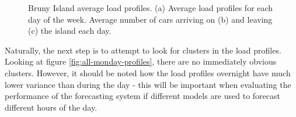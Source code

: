 \begin{figure}[htbp]
	\centering
	\vfil
	\vfil
	\caption{Bruny Island average load profiles. (a) Average load profiles for each day of the week. Average number of cars arriving on (b) and leaving (c) the island each day.}
	\label{fig:average-load-profiles}
\end{figure}

Naturally, the next step is to attempt to look for clusters in the load profiles.
Looking at figure \ref{fig:all-monday-profiles}, there are no immediately obvious clusters.
However, it should be noted how the load profiles overnight have much lower variance than during the day - this will be important when evaluating the performance of the forecasting system if different models are used to forecast different hours of the day.

